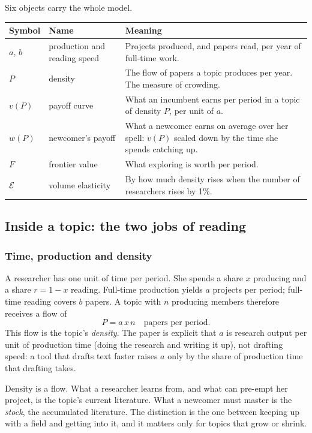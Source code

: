Six objects carry the whole model.

\begin{center}\small
\begin{tabularx}{\textwidth}{@{}P{0.55in}P{1.6in}L@{}}
\toprule
Symbol & Name & Meaning \\
\midrule
$a$, $b$ & production and reading speed & Projects produced, and papers read, per year of full-time work. \\
$P$ & density & The flow of papers a topic produces per year. The measure of crowding. \\
$v(P)$ & payoff curve & What an incumbent earns per period in a topic of density $P$, per unit of $a$. \\
$w(P)$ & newcomer's payoff & What a newcomer earns on average over her spell: $v(P)$ scaled down by the time she spends catching up. \\
$F$ & frontier value & What exploring is worth per period. \\
$\mathcal{E}$ & volume elasticity & By how much density rises when the number of researchers rises by 1\%. \\
\bottomrule
\end{tabularx}
\end{center}

\subsection{Inside a topic: the two jobs of reading}

\subsubsection{Time, production and density}
A researcher has one unit of time per period. She spends a share $x$ producing and a share $r=1-x$ reading. Full-time production yields $a$ projects per period; full-time reading covers $b$ papers. A topic with $n$ producing members therefore receives a flow of
\[
P = a\,x\,n \quad\text{papers per period.}
\]
This flow is the topic's \emph{density}. The paper is explicit that $a$ is research output per unit of production time (doing the research and writing it up), not drafting speed: a tool that drafts text faster raises $a$ only by the share of production time that drafting takes.

Density is a flow. What a researcher learns from, and what can pre-empt her project, is the topic's current literature. What a newcomer must master is the \emph{stock}, the accumulated literature. The distinction is the one between keeping up with a field and getting into it, and it matters only for topics that grow or shrink.


